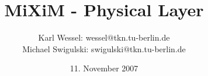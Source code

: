 \documentclass[10pt, a4paper]{article}
\begin{document}
\title{MiXiM - Physical Layer}
\author{Karl Wessel: wessel$@$tkn.tu-berlin.de\\
Michael Swigulski: swigulski$@$tkn.tu-berlin.de}
\date{11. November 2007}
\maketitle
%



%
\end{document}
